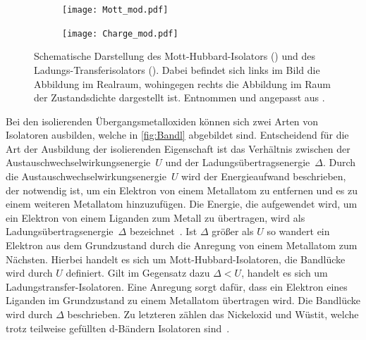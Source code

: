         \begin{figure}
            \centering
            \begin{subfigure}{0.48\textwidth}
                \centering
                \texttt{[image: Mott\_mod.pdf]}
                \subcaption{}
                \label{fig:Mott}
            \end{subfigure}
            \begin{subfigure}{0.48\textwidth}
                \centering
                \texttt{[image: Charge\_mod.pdf]}
                \subcaption{}
                \label{fig:Charge}
            \end{subfigure}
            \caption{Schematische Darstellung des Mott-Hubbard-Isolators () und des Ladungs-Transferisolators ().
            Dabei befindet sich links im Bild die Abbildung im Realraum, wohingegen rechts die Abbildung im Raum der Zustandsdichte dargestellt ist.
            Entnommen und angepasst aus \cite{stohr_magnetism_2006}.}
            \label{fig:Bandl}
        \end{figure}
        Bei den isolierenden Übergangsmetalloxiden können sich zwei Arten von Isolatoren ausbilden, welche in \autoref{fig:Bandl} abgebildet sind.
        Entscheidend für die Art der Ausbildung der isolierenden Eigenschaft ist das Verhältnis zwischen der Austauschwechselwirkungsenergie~$U$ und der Ladungsübertragsenergie~$\Delta$.
        Durch die Austauschwechselwirkungsenergie~$U$ wird der Energieaufwand beschrieben, der notwendig ist, um ein Elektron von einem Metallatom zu entfernen und es zu einem weiteren Metallatom hinzuzufügen.
        Die Energie, die aufgewendet wird, um ein Elektron von einem Liganden zum Metall zu übertragen, wird als Ladungsübertragsenergie~$\Delta$ bezeichnet~\cite{stohr_magnetism_2006}.
        Ist $\Delta$ größer als $U$ so wandert ein Elektron aus dem Grundzustand durch die Anregung von einem Metallatom zum Nächsten.
        Hierbei handelt es sich um Mott-Hubbard-Isolatoren, die Bandlücke wird durch $U$ definiert.
        Gilt im Gegensatz dazu $\Delta < U$, handelt es sich um Ladungstransfer-Isolatoren.
        Eine Anregung sorgt dafür, dass ein Elektron eines Liganden im Grundzustand zu einem Metallatom übertragen wird.
        Die Bandlücke wird durch $\Delta$ beschrieben.
        Zu letzteren zählen das Nickeloxid und Wüstit, welche trotz teilweise gefüllten d-Bändern Isolatoren sind~\cite{IF_5}.

